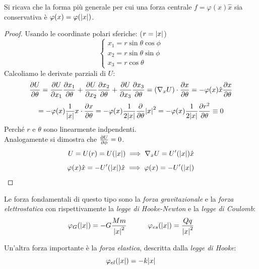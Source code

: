 \begin{remark}
    Si ricava che la forma più generale per cui una forza centrale $f= \varphi(x)\hat{x}$ sia conservativa è $\varphi(x)=\varphi(\abs{x})$.
\end{remark}
\begin{proof}
    Usando le coordinate polari sferiche:     ($r = \abs{x}$)
    \begin{equation}
        \begin{cases}
            x_1 = r \sin\theta \cos\phi \\
            x_2 = r \sin\theta \sin\phi \\
            x_3 = r \cos\theta 
        \end{cases}
    \end{equation}
    Calcoliamo le derivate parziali di $U$:
    \begin{equation*}
        \pdv{U}{\theta}= \pdv{U}{x_1}\pdv{x_1}{\theta}+\pdv{U}{x_2}\pdv{x_2}{\theta}+\pdv{U}{x_3}\pdv{x_3}{\theta}=
         \left( \nabla_xU \right)\cdot\pdv{x}{\theta}= -\varphi(x)\hat{x}\pdv{x}{\theta}
    \end{equation*}
    \begin{equation}
        =-\varphi(x)\frac{1}{\abs{x}}x\cdot \pdv{x}{\theta}= - \varphi(x)\frac{1}{2\abs{x}}\pdv{\theta}\abs{x}^2
        =- \varphi(x)\frac{1}{2\abs{x}}\pdv{r^2}{\theta}\equiv0 
    \end{equation}
    Perché $r$ e $\theta$ sono linearmente indpendenti.\\
    Analogamente si dimostra che $\pdv{U}{\phi}=0$.
    \begin{equation*}
        U = U(r) = U(\abs{x})\implies \nabla_xU= U'(\abs{x})\hat{x}
    \end{equation*}
    \begin{equation*}
        \varphi(x)\hat{x}=-U'(\abs{x})\hat{x}\implies \varphi(x)= -U'(\abs{x})
    \end{equation*}
\end{proof}

Le forza fondamentali di questo tipo sono la \textit{forza gravitazionale} e la \textit{forza elettrostatica} 
con rispettivamente la \textit{legge di Hooke-Newton} e la \textit{legge di Coulomb}:
\begin{equation}
    \varphi_G(\abs{x})= -G\frac{Mm}{\abs{x}^2}\qquad \quad \varphi_{es}(\abs{x})=\frac{Qq}{\abs{x}^2}
\end{equation}

Un'altra forza importante è la \textit{forza elastica}, descritta dalla \textit{legge di Hooke}:
\begin{equation}
    \varphi_{el}(\abs{x})= -k\abs{x}
\end{equation}

